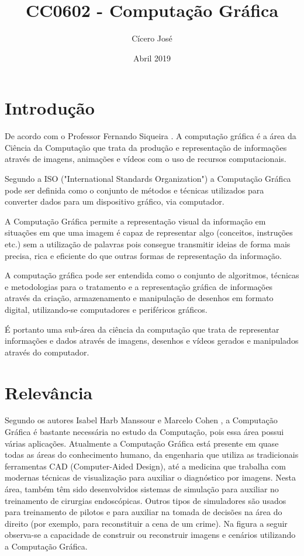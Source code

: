 \documentclass[10pt]{article}
\title{CC0602 - Computação Gráfica}
\author{Cícero José}
\date{Abril 2019}
\begin{document}
\maketitle

\section{Introdução}
\quad De acordo com o Professor Fernando Siqueira \cite{ProfessorFernandodeSiqueira}. A computação gráfica é a área da Ciência da Computação que trata da produção e representação de informações através de imagens, animações e vídeos com o uso de recursos computacionais.

\quad Segundo a ISO ("International Standards Organization") a Computação Gráfica pode ser definida como o conjunto de métodos e técnicas utilizados para converter dados para um dispositivo gráfico, via computador.

\quad A Computação Gráfica permite a representação visual da informação em situações em que uma imagem é capaz de representar algo (conceitos, instruções etc.) sem a utilização de palavras pois consegue transmitir ideias de forma mais precisa, rica e eficiente do que outras formas de representação da informação.

\quad A computação gráfica pode ser entendida como o conjunto de algoritmos, técnicas e metodologias para o tratamento e a representação gráfica de informações através da criação, armazenamento e manipulação de desenhos em formato digital, utilizando-se computadores e periféricos gráficos.

\quad É portanto uma sub-área da ciência da computação que trata de representar informações e dados através de imagens, desenhos e vídeos gerados e manipulados através do computador.

\section{Relevância}
\quad Segundo os autores Isabel Harb Manssour e Marcelo Cohen \cite{Isabel}, a Computação Gráfica é bastante necessária no estudo da Computação, pois essa área possui várias aplicações. Atualmente a Computação Gráfica está presente em quase todas as áreas do conhecimento humano, da engenharia que utiliza as tradicionais ferramentas CAD (Computer-Aided Design), até a
medicina que trabalha com modernas técnicas de visualização para auxiliar o diagnóstico por
imagens. Nesta área, também têm sido desenvolvidos sistemas de simulação para auxiliar no
treinamento de cirurgias endoscópicas. Outros tipos de simuladores são usados para treinamento de pilotos e para auxiliar na tomada de decisões na área do direito (por exemplo, para
reconstituir a cena de um crime).
\quad Na figura a seguir observa-se a capacidade de construir ou reconstruir imagens e cenários utilizando a Computação Gráfica.\newline 
\end{document}
